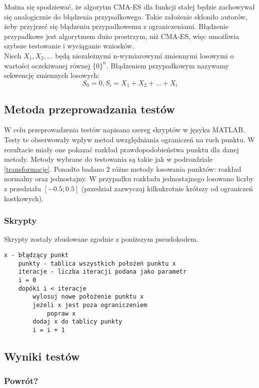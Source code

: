 \documentclass{mini}
\begin{document}
Można się spodziewać, że algorytm CMA-ES dla funkcji stałej będzie zachowywał się analogicznie do błądzenia przypadkowego. Takie założenie skłoniło autorów, żeby przyjrzeć się błądzeniu przypadkowemu z ograniczeniami. Błądzenie przypadkowe jest algorytmem dużo prostrzym, niż CMA-ES, więc umożliwia szybsze testowanie i wyciąganie wniosków.\\
Niech $ X_1, X_2, ... $ będą niezależnymi n-wymiarowymi zmiennymi losowymi o wartości oczekiwanej równej $ \{0\}^n $. Błądzeniem przypadkowym nazywamy sekwencję zmiennych losowych:
\begin{equation}
S_0 = 0, S_i=X_1+X_2+...+X_i
\end{equation}

\subsection{Metoda przeprowadzania testów}
W celu przeprowadzenia testów napisano szereg skryptów w języku MATLAB. Testy te obserwowały wpływ metod uwzględniania ograniczeń na ruch punktu. W rezultacie miały one pokazać rozkład prawdopodobieństwa punktu dla danej metody. Metody wybrane do testowania są takie jak w podrozdziale \ref{transformacje}.
Ponadto badano 2 różne metody losowania punktów: rozkład normalny oraz jednostajny. W przypadku rozkładu jednostajnego losowano liczby z przedziału $[-0.5; 0.5]$ (przedział zazwyczaj kilkukrotnie krótszy od ograniczeń kostkowych).

\subsubsection{Skrypty}
Skrypty zostały zbudowane zgodnie z poniższym pseudokodem.
\begin{Verbatim}[baselinestretch=1.1]
	x - błądzący punkt
	punkty - tablica wszystkich położeń punktu x
	iteracje - liczba iteracji podana jako parametr
	i = 0
	dopóki i < iteracje
		wylosuj nowe położenie punktu x
		jeżeli x jest poza ograniczeniem
			popraw x
		dodaj x do tablicy punkty
		i = i + 1
\end{Verbatim}

\subsection{Wyniki testów}

\subsubsection{Powrót?}
\end{document}
